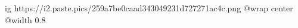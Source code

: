  
 
 
 
 

\ifcmt
  ig https://i2.paste.pics/259a7be0caad343049231d727271ac4c.png
  @wrap center
  @width 0.8
\fi
